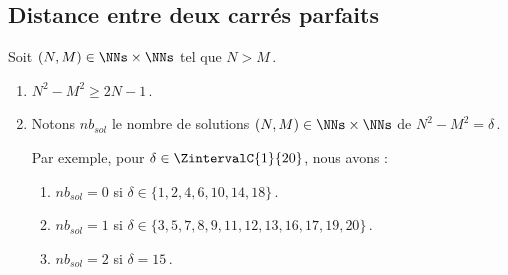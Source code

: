 

\subsection{Distance entre deux carrés parfaits}

\begin{fact} \label{diff-square-ko}
	Soit $(N, M) \in \NNs \times \NNs$ tel que $N > M$\,.
	\begin{enumerate}
		\item $N^2 - M^2 \geq 2N - 1$\,.
		
		\item Notons $nb_{sol}$ le nombre de solutions $(N, M) \in \NNs \times \NNs$ de $N^2 - M^2 = \delta$\,.
		
		\smallskip
		\noindent
		Par exemple, pour $\delta \in \ZintervalC{1}{20}$, nous avons :
		\begin{enumerate}
			\item $nb_{sol}= 0$ si $\delta \in \{ 1, 2, 4, 6, 10, 14, 18\}$\,.

			\item $nb_{sol}= 1$ si $\delta \in \{ 3, 5, 7, 8, 9, 11, 12, 13, 16, 17, 19, 20 \}$\,.

			\item $nb_{sol}= 2$ si $\delta = 15$\,.
		\end{enumerate}
	\end{enumerate}
\end{fact}


